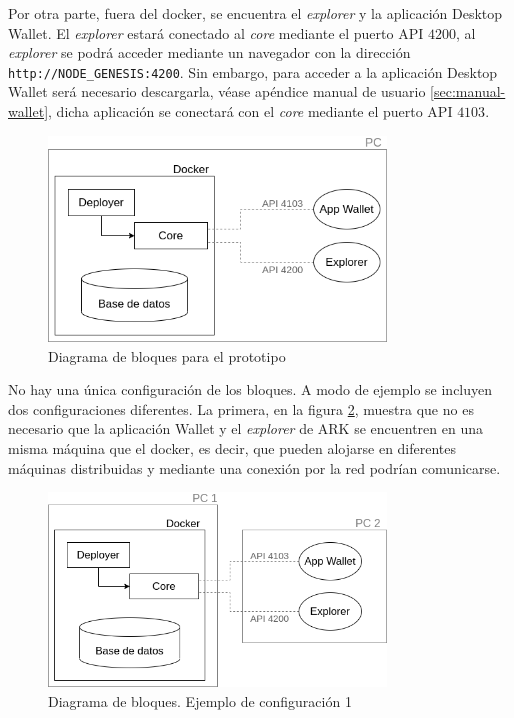 Por otra parte, fuera del docker, se encuentra el \textit{explorer} y la aplicación Desktop Wallet. El \textit{explorer} estará conectado al \textit{core} mediante el puerto API $4200$, al \textit{explorer} se podrá acceder mediante un navegador con la dirección \mbox{\texttt{http://NODE\_GENESIS:4200}}. Sin embargo, para acceder a la aplicación Desktop Wallet será necesario descargarla, véase apéndice manual de usuario \ref{sec:manual-wallet}, dicha aplicación se conectará con el \textit{core} mediante el puerto API $4103$.\\


\begin{figure}[H]
	\centering
	\includegraphics[width=0.8\textwidth]{figuras/diagrama_bloquesARK.png}
	\caption{Diagrama de bloques para el prototipo}
	\label{fig:diag-bloques-1}
\end{figure}

No hay una única configuración de los bloques. A modo de ejemplo se incluyen dos configuraciones diferentes. La primera, en la figura \ref{fig:diag-bloques-2}, muestra que no es necesario que la aplicación Wallet y el \textit{explorer} de ARK se encuentren en una misma máquina que el docker, es decir, que pueden alojarse en diferentes máquinas distribuidas y mediante una conexión por la red podrían comunicarse.\\ 

\begin{figure}[H]
	\centering
	\includegraphics[width=0.8\textwidth]{figuras/diagrama_bloquesARK2.png}
	\caption{Diagrama de bloques. Ejemplo de configuración 1}
	\label{fig:diag-bloques-2}
\end{figure}

